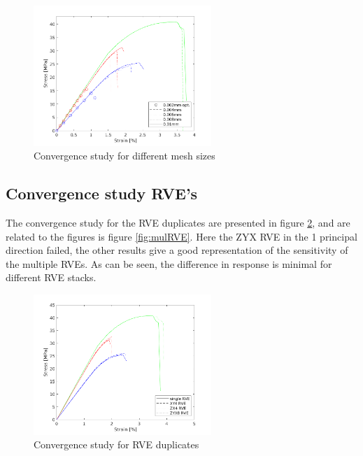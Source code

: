 \begin{figure}[H]
    \centering
    \includegraphics[width=0.60\textwidth]{chapter_7_non-elasticmodelling/figures/meshconv.png}
    \caption{Convergence study for different mesh sizes}
    \label{fig:meshconv}
\end{figure}

\subsection{Convergence study RVE's}
The convergence study for the RVE duplicates are presented in figure \ref{fig:RVEgraph}, and are related to the figures is figure \ref{fig:mulRVE}. Here the ZYX RVE in the 1 principal direction failed, the other results give a good representation of the sensitivity of the multiple RVEs. As can be seen, the difference in response is minimal for different RVE stacks. 

\begin{figure}[H]
    \centering
    \includegraphics[width=0.60\textwidth]{chapter_7_non-elasticmodelling/figures/RVEconv.png}
    \caption{Convergence study for RVE duplicates}
    \label{fig:RVEgraph}
\end{figure}

